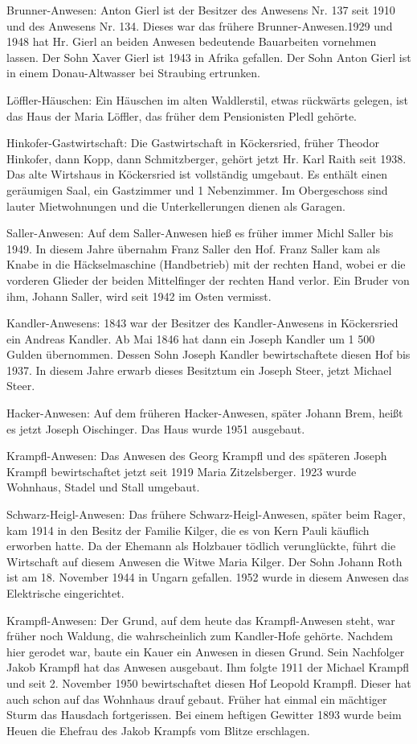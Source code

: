 Brunner-Anwesen: Anton Gierl ist der Besitzer des Anwesens Nr. 137 seit 1910 und
des Anwesens Nr. 134. Dieses war das frühere Brunner-Anwesen.1929 und 1948 hat
Hr. Gierl an beiden Anwesen bedeutende Bauarbeiten vornehmen lassen. Der Sohn
Xaver Gierl ist 1943 in Afrika gefallen. Der Sohn Anton Gierl ist in einem
Donau-Altwasser bei Straubing ertrunken.

Löffler-Häuschen: Ein Häuschen im alten Waldlerstil, etwas rückwärts gelegen,
ist das Haus der Maria Löffler, das früher dem Pensionisten Pledl gehörte.

Hinkofer-Gastwirtschaft: Die Gastwirtschaft in Köckersried, früher Theodor
Hinkofer, dann Kopp, dann Schmitzberger, gehört jetzt Hr. Karl Raith seit 1938.
Das alte Wirtshaus in Köckersried ist vollständig umgebaut. Es enthält einen
geräumigen Saal, ein Gastzimmer und 1 Nebenzimmer. Im Obergeschoss sind lauter
Mietwohnungen und die Unterkellerungen dienen als Garagen.

Saller-Anwesen: Auf dem Saller-Anwesen hieß es früher immer Michl Saller bis
1949. In diesem Jahre übernahm Franz Saller den Hof. Franz Saller kam als Knabe
in die Häckselmaschine (Handbetrieb) mit der rechten Hand, wobei er die vorderen
Glieder der beiden Mittelfinger der rechten Hand verlor. Ein Bruder von ihm,
Johann Saller, wird seit 1942 im Osten vermisst.

Kandler-Anwesens: 1843 war der Besitzer des Kandler-Anwesens in Köckersried ein
Andreas Kandler. Ab Mai 1846 hat dann ein Joseph Kandler um 1 500 Gulden
übernommen. Dessen Sohn Joseph Kandler bewirtschaftete diesen Hof bis 1937. In
diesem Jahre erwarb dieses Besitztum ein Joseph Steer, jetzt Michael Steer.

Hacker-Anwesen: Auf dem früheren Hacker-Anwesen, später Johann Brem, heißt es
jetzt Joseph Oischinger. Das Haus wurde 1951 ausgebaut.

Krampfl-Anwesen: Das Anwesen des Georg Krampfl und des späteren Joseph Krampfl
bewirtschaftet jetzt seit 1919 Maria Zitzelsberger. 1923 wurde Wohnhaus, Stadel
und Stall umgebaut.

Schwarz-Heigl-Anwesen: Das frühere Schwarz-Heigl-Anwesen, später beim Rager, kam
1914 in den Besitz der Familie Kilger, die es von Kern Pauli käuflich erworben
hatte. Da der Ehemann als Holzbauer tödlich verunglückte, führt die Wirtschaft
auf diesem Anwesen die Witwe Maria Kilger. Der Sohn Johann Roth ist am 18.
November 1944 in Ungarn gefallen. 1952 wurde in diesem Anwesen das Elektrische
eingerichtet.

Krampfl-Anwesen: Der Grund, auf dem heute das Krampfl-Anwesen steht, war früher
noch Waldung, die wahrscheinlich zum Kandler-Hofe gehörte. Nachdem hier gerodet
war, baute ein Kauer ein Anwesen in diesen Grund. Sein Nachfolger Jakob Krampfl
hat das Anwesen ausgebaut. Ihm folgte 1911 der Michael Krampfl und seit 2.
November 1950 bewirtschaftet diesen Hof Leopold Krampfl. Dieser hat auch schon
auf das Wohnhaus drauf gebaut. Früher hat einmal ein mächtiger Sturm das
Hausdach fortgerissen. Bei einem heftigen Gewitter 1893 wurde beim Heuen die
Ehefrau des Jakob Krampfs vom Blitze erschlagen.

